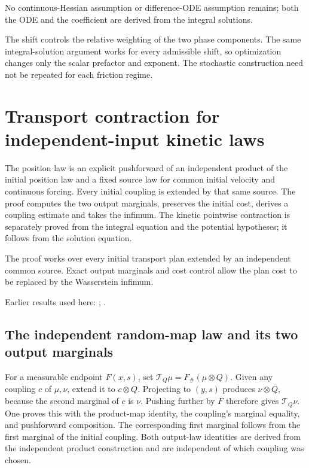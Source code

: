 \documentclass[11pt,a4paper]{report}
\begin{document}
No continuous-Hessian assumption or difference-ODE assumption remains; both the ODE and the coefficient are derived from the integral solutions.



The shift controls the relative weighting of the two phase components. The same integral-solution argument works for every admissible shift, so optimization changes only the scalar prefactor and exponent. The stochastic construction need not be repeated for each friction regime.

\section{\texorpdfstring{Transport contraction for independent-input kinetic laws}{Transport contraction for independent-input kinetic laws}}
\label{proof-module-KineticLangevin-FlowLaw-lean}


The position law is an explicit pushforward of an independent product of the initial position law and a fixed source law for common initial velocity and continuous forcing. Every initial coupling is extended by that same source. The proof computes the two output marginals, preserves the initial cost, derives a coupling estimate and takes the infimum. The kinetic pointwise contraction is separately proved from the integral equation and the potential hypotheses; it follows from the solution equation.



The proof works over every initial transport plan extended by an independent common source. Exact output marginals and cost control allow the plan cost to be replaced by the Wasserstein infimum.



Earlier results used here: \cite[Section~3.22]{LangevinLean2026ULASC}; \cite[Section~3.18]{LangevinLean2026ULASC}.
\subsection{\texorpdfstring{The independent random-map law and its two output marginals}{The independent random-map law and its two output marginals}}
\label{report-step-KineticLangevin-FlowLaw-lean-1}


For a measurable endpoint \(F(x,s)\), set \(\mathcal T_Q\mu=F_\#(\mu\otimes Q)\). Given any coupling \(c\) of \(\mu,\nu\), extend it to \(c\otimes Q\). Projecting to \((y,s)\) produces \(\nu\otimes Q\), because the second marginal of \(c\) is \(\nu\). Pushing further by \(F\) therefore gives \(\mathcal T_Q\nu\). One proves this with the product-map identity, the coupling's marginal equality, and pushforward composition. The corresponding first marginal follows from the first marginal of the initial coupling. Both output-law identities are derived from the independent product construction and are independent of which coupling was chosen.
\end{document}
